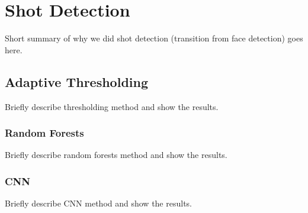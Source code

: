 \section*{Shot Detection}

Short summary of why we did shot detection (transition from face detection) goes here.

\subsection*{Adaptive Thresholding}

Briefly describe thresholding method and show the results.

\subsubsection*{Random Forests}

Briefly describe random forests method and show the results.

\subsubsection*{CNN}

Briefly describe CNN method and show the results.